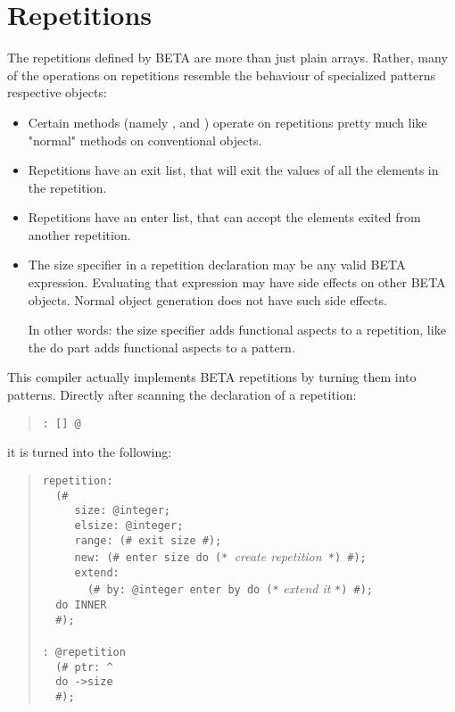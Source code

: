 \section{Repetitions}
The repetitions defined by BETA are more than just plain arrays.
Rather, many of the operations on repetitions resemble the
behaviour of specialized patterns respective objects:
\begin{itemize}
\item Certain methods (namely ,  and
    ) operate on repetitions pretty much like "normal"
    methods on conventional objects.
\item Repetitions have an exit list, that will exit the values of
    all the elements in the repetition.
\item Repetitions have an enter list, that can accept the elements
    exited from another repetition.
\item The size specifier in a repetition declaration may be any
    valid BETA expression.  Evaluating that expression may have
    side effects on other BETA objects.  Normal object generation
    does not have such side effects.

    In other words: the size specifier adds functional aspects
    to a repetition, like the do part adds functional aspects
    to a pattern.
\end{itemize}

This compiler actually implements BETA repetitions by turning them
into patterns.  Directly after scanning the declaration of a
repetition:
\begin{quote}\tt {}: [] @
\end{quote}
it is turned into the following:
\begin{quote}\verb+repetition:+\\
   \verb+  (#+\\
   \verb+     size: @integer;+\\
   \verb+     elsize: @integer;+\\
   \verb+     range: (# exit size #);+\\
   \verb+     new: (# enter size do (* +{\it create repetition}\verb+ *) #);+\\
   \verb+     extend:+\\
   \verb+       (# by: @integer enter by do (*+
		    {\it extend it\/} \verb+*) #);+\\
   \verb+  do INNER+\\
   \verb+  #);+\\
   \verb++\\
   \verb+: @repetition+\\
   \verb+  (# ptr: ^+\\
   \verb+  do +\verb+->size+\\
   \verb+  #);+
\end{quote}

